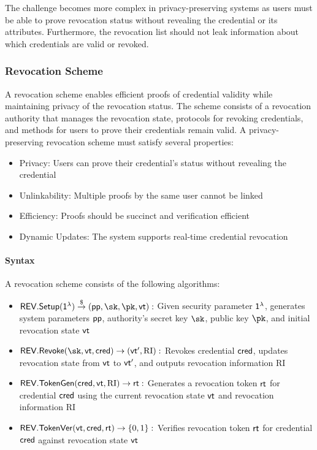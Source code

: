 The challenge becomes more complex in privacy-preserving systems as users must be able to prove revocation status without revealing the credential or its attributes. Furthermore, the revocation list should not leak information about which credentials are valid or revoked. 

\subsubsection{Revocation Scheme}
A revocation scheme enables efficient proofs of credential validity while maintaining privacy of the revocation status. The scheme consists of a revocation authority that manages the revocation state, protocols for revoking credentials, and methods for users to prove their credentials remain valid. A privacy-preserving revocation scheme must satisfy several properties:

\begin{itemize}
    \item Privacy: Users can prove their credential's status without revealing the credential
    \item Unlinkability: Multiple proofs by the same user cannot be linked
    \item Efficiency: Proofs should be succinct and verification efficient
    \item Dynamic Updates: The system supports real-time credential revocation
\end{itemize}

\paragraph{Syntax}
A revocation scheme consists of the following algorithms:

\begin{itemize}
    \item $\revsetup(\secparam) \torand (\ppar, \sk, \pk, \vt):$ Given security parameter $\mathsf{1^{\lambda}}$, generates system parameters $\mathsf{pp}$, authority's secret key $\sk$, public key $\pk$, and initial revocation state $\mathsf{vt}$
    
    \item $\revrevoke(\sk, \vt, \cred) \to (\vt', \text{RI}):$ Revokes credential $\mathsf{cred}$, updates revocation state from $\mathsf{vt}$ to $\mathsf{vt}'$, and outputs revocation information RI
    
    \item $\mathsf{REV.TokenGen}(\mathsf{cred}, \mathsf{vt}, \text{RI}) \to \mathsf{rt}:$ Generates a revocation token $\mathsf{rt}$ for credential $\mathsf{cred}$ using the current revocation state $\mathsf{vt}$ and revocation information RI
    
    \item $\mathsf{REV.TokenVer}(\mathsf{vt}, \mathsf{cred}, \mathsf{rt}) \to \{0,1\}:$ Verifies revocation token $\mathsf{rt}$ for credential $\mathsf{cred}$ against revocation state $\mathsf{vt}$
\end{itemize}

